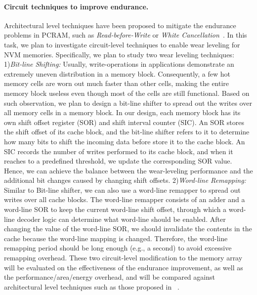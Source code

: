 \paragraph{Circuit techniques to improve endurance.} Architectural level techniques have been proposed to mitigate the endurance problems in PCRAM, such as \textit{Read-before-Write} or \textit{White Cancellation}~\cite{Lee09,PRAM:IBM}. In this task, we plan to investigate circuit-level techniques to enable wear leveling for NVM memories. Specifically, we plan to study
two wear leveling techniques: 1)\textit{Bit-line Shifting:} Usually, write-operations in applications demonstrate an extremely uneven distribution in a memory block. Consequently, a few hot memory cells are worn out much faster than other cells, making the entire memory block useless even though most of the cells are still functional. Based on such observation, we plan to design a bit-line shifter to spread out the writes over all memory cells in a memory block. In our design, each memory block has its own shift offset register (SOR) and shift interval counter (SIC). An SOR stores the shift offset of its cache block, and the bit-line shifter refers
to it to determine how many bits to shift the incoming data before store it to the cache block. An SIC records the number of writes performed to its cache block, and when it reaches to a predefined threshold, we update the corresponding SOR
value.  Hence, we can achieve
the balance between the wear-leveling performance and the
additional bit changes caused by changing shift offsets. 2)\textit{Word-line Remapping:} Similar to Bit-line shifter, we can also
use a word-line remapper to spread out writes over all cache
blocks. The word-line remapper consists of an adder and a
word-line SOR to keep the current word-line shift offset,
through which a word-line decoder logic can determine what
word-line should be enabled.   After changing the value of the word-line SOR, we should
invalidate the contents in the cache because the word-line mapping
is changed. Therefore, the word-line remapping period
should be long enough (e.g., a second) to avoid excessive
remapping overhead. These two circuit-level modification to the memory array will be evaluated on the effectiveness of the endurance improvement, as well as the performance/area/energy overhead, and will be compared against architectural level techniques such as those proposed in  ~\cite{Lee09,PRAM:IBM}.


